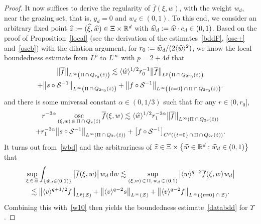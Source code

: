 \documentclass[10pt]{amsart}
\theoremstyle{definition}\newtheorem{defi}[theo]{Definition}\newtheorem{rema}[theo]{Remark}\newtheorem{exam}[theo]{Example}\newtheorem{exem}[theo]{Example}\newtheorem{nota}[theo]{Notation}
\newcommand*{\dif}{\mathop{}\!\mathrm{d}}
\newcommand*\osc {\mathrm{osc}}
\newcommand*\R {\mathbb{R}}
\renewcommand*\SS {\mathcal{S}}
\newcommand*\Z {\mathcal{Z}}
\newcommand{\la}{\langle}
\newcommand{\ra}{\rangle}
\newcommand{\lv}{\langle v\rangle}
\let\oldhat\hat
\renewcommand*{\hat}[1]{\mathchoice{\widehat{#1}}{\widehat{#1}}{\oldhat{#1}}{\oldhat{#1}}}
\begin{document}
\begin{proof}
It now suffices to derive the regularity of $\overline{f}(\xi,w)$, with the weight $w_d$, near the grazing set, that is, $y_d=0$ and $w_d\in(0,1)$. To this end, we consider an arbitrary fixed point $\hat{z}:=(\hat{\xi},\hat{w})\in\Xi\times\R^d$ with $\hat{w}_d:=\hat{w}\cdot e_d\in(0,1)$. Based on the proof of Proposition~\ref{local} (see the derivation of the estimates~\eqref{bddF}, \eqref{osc+} and~\eqref{oscb}) with the dilation argument, for $r_0:=\hat{w}_d/(2\la\hat{w}\ra^2)$, we know the local boundedness estimate from $L^p$ to $L^\infty$ with $p=2+4d$ that
\begin{multline}\label{wbd}
\big\|\overline{f}\big\|_{L^\infty\left(\Pi\,\cap\,Q_{r_0}(\hat{z})\right)}
\lesssim \la\hat{w}\ra^{1/2}r_0^{-1}\big\|\overline{f}\big\|_{L^p\left(\Pi\,\cap\,Q_{2r_0}(\hat{z})\right)} \\
+ \big\|s\circ\SS^{-1}\big\|_{L^\infty\left(\Pi\,\cap\, Q_{2r_0}(\hat{z})\right)} + \big\|f\circ\SS^{-1}\big\|_{L^\infty\left(\{t=0\}\,\cap\,\Pi\,\cap\,Q_{2r_0}(\hat{z})\right)}.
\end{multline}
and there is some universal constant $\alpha\in(0,1/3)$ such that for any $r\in(0,r_0]$,
\begin{multline}\label{wholder}
{r}^{-3\alpha}\mathop{\osc}\limits_{(\xi,w)\,\in\,\Pi\,\cap\, Q_{{r}}(\hat{z})}\overline{f}(\xi,w)
\lesssim \la\hat{w}\ra^{1/2}r_1^{-3\alpha}\big\|\overline{f}\big\|_{L^\infty\left(\Pi\,\cap\,Q_{2{r}}(\hat{z})\right)}\\
+ r_1^{-3\alpha} \big\|s\circ\SS^{-1}\big\|_{L^\infty\left(\Pi\,\cap\,Q_{2{r}}(\hat{z})\right)} + \big[f\circ\SS^{-1}\big]_{C^\beta\left(\{t=0\}\,\cap\,\Pi\,\cap\,Q_{2{r}}(\hat{z})\right)}.
\end{multline}
It turns out from~\eqref{wbd} and the arbitrariness of $\hat{z}\in\Xi\times\big\{\hat{w}\in\R^d:\hat{w}_d\in(0,1)\big\}$ that
\begin{multline*}
\sup_{\xi\,\in\,\Xi}\int_{\left\{\hat{w}_d\in(0,1)\right\}} \big|\overline{f}(\xi,w)\big|\, w_d \dif w
\lesssim \sup_{(\xi,w)\,\in\,\Pi,\;\!w_d\,\in\,(0,1)} \big|\la w\ra^{q-2}\overline{f}(\xi,w)\;\!w_d\big| \\
\lesssim \big\|\lv^{q+1/2}f\big\|_{L^p(\Z)} +\big\|\lv^{q-2}s\big\|_{L^\infty(\Z)} +\big\|\lv^{q-2}f\big\|_{L^\infty(\{t=0\}\,\cap\,\Z)}.
\end{multline*}
Combining this with~\eqref{w10} then yields the boundedness estimate~\eqref{databdd} for $\Upsilon$.


\end{proof}
\end{document}
